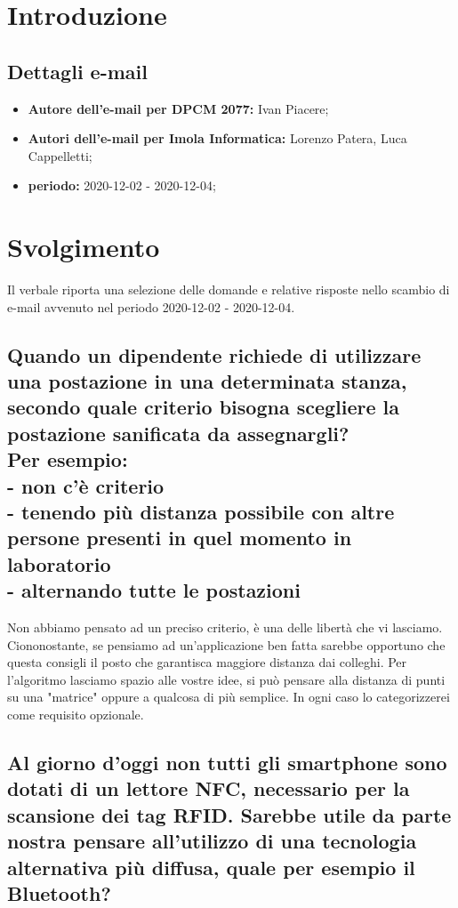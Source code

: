 \section*{Introduzione}
\subsection*{Dettagli e-mail}
\begin{itemize}
	\item \textbf{Autore dell'e-mail per DPCM 2077:} Ivan Piacere;
	\item \textbf{Autori dell'e-mail per Imola Informatica:} Lorenzo Patera, Luca Cappelletti;
	\item \textbf{periodo:} 2020-12-02 - 2020-12-04;
\end{itemize}

\section*{Svolgimento}
Il verbale riporta una selezione delle domande e relative risposte nello scambio di e-mail avvenuto nel periodo 2020-12-02 - 2020-12-04.
\subsection*{Quando un dipendente richiede di utilizzare una postazione in una determinata stanza, secondo quale criterio bisogna scegliere la postazione sanificata da assegnargli? \\
	Per esempio: \\
	- non c'è criterio \\
	- tenendo più distanza possibile con altre persone presenti in quel momento in laboratorio \\
	- alternando tutte le postazioni}

Non abbiamo pensato ad un preciso criterio, è una delle libertà che vi lasciamo. Ciononostante, se pensiamo ad un'applicazione ben fatta sarebbe opportuno che questa consigli il posto che garantisca maggiore distanza dai colleghi. Per l'algoritmo lasciamo spazio alle vostre idee, si può pensare alla distanza di punti su una "matrice" oppure a qualcosa di più semplice. In ogni caso lo categorizzerei come requisito opzionale.

\subsection*{Al giorno d'oggi non tutti gli smartphone sono dotati di un lettore NFC, necessario per la scansione dei tag RFID. Sarebbe utile da parte nostra pensare all'utilizzo di una tecnologia alternativa più diffusa, quale per esempio il Bluetooth?}

